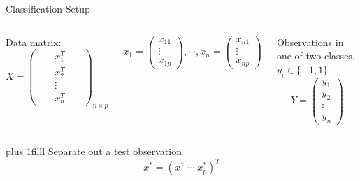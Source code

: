 \documentclass[aspectratio=169,usenames,dvipsnames]{beamer}
\newcommand{\bvfill}{\vskip0pt plus 1filll}
\begin{document}
\begin{frame}[t]{Classification Setup}

\begin{columns}
\centering
 Data matrix:
	\begin{equation*}
		X =
		\begin{pmatrix}
			- & x_1^T & -\\
			- & x_2^T & -\\
			 & \vdots & \\
			- & x_n^T & -
		\end{pmatrix}_{n \times p}
	\end{equation*}

	\begin{equation*}
		x_1 =
		\begin{pmatrix}
			x_{11} \\
			\vdots \\
			x_{1p}
		\end{pmatrix}
		,\cdots,
		x_n =
		\begin{pmatrix}
			x_{n1} \\
			\vdots \\
			x_{np}
		\end{pmatrix}
	\end{equation*}

\centering
 Observations in one of two classes, $y_i \in \{-1,1\}$
	\begin{equation*}
		Y =
		\begin{pmatrix}
			y_1 \\
			y_2\\
			\vdots \\
			y_n
		\end{pmatrix}
	\end{equation*}



\end{columns}
\bvfill
\centering
Separate out a test observation
\begin{equation*}
	x^* = (x_1^* \; \cdots \; x^*_p)^T
\end{equation*}
\end{frame}
\end{document}
